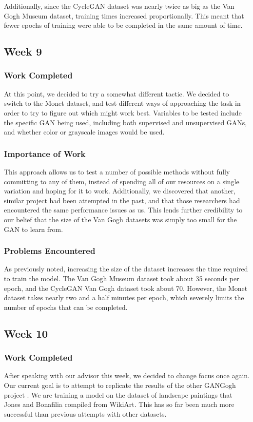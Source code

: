 \documentclass[12pt,letterpaper]{article}
\begin{document}
	Additionally, since the CycleGAN dataset was nearly twice as big as the Van Gogh Museum dataset, training times increased proportionally.
	This meant that fewer epochs of training were able to be completed in the same amount of time.

	\subsection{Week 9}
	\subsubsection{Work Completed}
	At this point, we decided to try a somewhat different tactic.
	We decided to switch to the Monet dataset, and test different ways of approaching the task in order to try to figure out which might work best.
	Variables to be tested include the specific GAN being used, including both supervised and unsupervised GANs, and whether color or grayscale images would be used.
	\subsubsection{Importance of Work}
	This approach allows us to test a number of possible methods without fully committing to any of them, instead of spending all of our resources on a single variation and hoping for it to work.
	Additionally, we discovered that another, similar project had been attempted in the past\cite{otherGanGogh}, and that those researchers had encountered the same performance issues as us.
	This lends further credibility to our belief that the size of the Van Gogh datasets was simply too small for the GAN to learn from.
	\subsubsection{Problems Encountered}
	As previously noted, increasing the size of the dataset increases the time required to train the model.
	The Van Gogh Museum dataset took about 35 seconds per epoch, and the CycleGAN Van Gogh dataset took about 70.
	However, the Monet dataset takes nearly two and a half minutes per epoch, which severely limits the number of epochs that can be completed.

	\subsection{Week 10}
	\subsubsection{Work Completed}
	After speaking with our advisor this week, we decided to change focus once again.
	Our current goal is to attempt to replicate the results of the other GANGogh project \cite{otherGanGogh}.
	We are training a model on the dataset of landscape paintings that Jones and Bonafilia compiled from WikiArt.
	This has so far been much more successful than previous attempts with other datasets.
\end{document}
